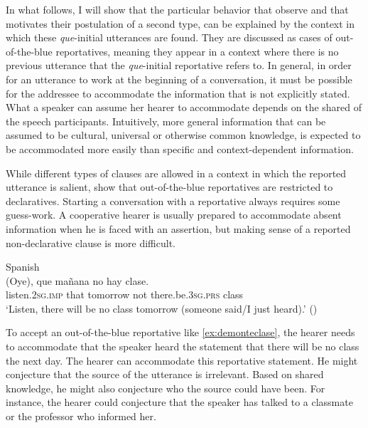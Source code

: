 In what follows, I will show that  the particular behavior that \citet{DemonteSoriano2014} observe and that motivates their postulation of a second type, can be explained by the context in which these \emph{que}-initial utterances are found. They are discussed as cases of  out-of-the-blue reportatives, meaning they appear in a context where there is no previous utterance that the \emph{que}-initial reportative refers to.  In general, in order for an utterance to work at the beginning of a conversation, it must be possible for the  addressee to  accommodate  the information that is not explicitly stated. What a speaker can assume her hearer to accommodate depends on the shared   of the speech participants. Intuitively, more general information that can be assumed to be cultural, universal or otherwise common knowledge,  is expected to  be accommodated more easily than specific and context-dependent information.

 While  different types of clauses are allowed in a context in which the reported utterance is salient, \citet{DemonteSoriano2014} show that out-of-the-blue reportatives are restricted to declaratives. Starting a conversation with a reportative  always requires some guess-work. A cooperative hearer is usually prepared to accommodate  absent information when he is faced with an assertion, but making sense of a reported non-declarative clause is more difficult.
 
\ea\label{ex:demonteclase} Spanish \\ 
\gll  (Oye), que ma\~nana no hay clase.\\
	  listen.\textsc{2sg.imp} that tomorrow not there.be.\textsc{3sg.prs} class\\
\glt `Listen, there will be no class tomorrow (someone said\slash I just heard).' (\citealt[16: ex 12a]{DemonteSoriano2014})
\z
 
 To accept an out-of-the-blue reportative like \eqref{ex:demonteclase}, the hearer needs to accommodate that the speaker heard the statement that there will be no class the next day. The hearer can accommodate this reportative statement. He might  conjecture that the source of the utterance is irrelevant. Based on shared knowledge, he might also conjecture who the source could have been. For instance, the hearer could conjecture that the speaker has talked to a classmate or the professor who informed her.
 

